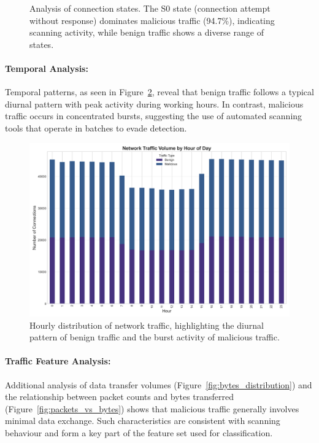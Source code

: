 \begin{figure}[htbp]
    \caption{Analysis of connection states. The S0 state (connection attempt without response) dominates malicious traffic (94.7\%), indicating scanning activity, while benign traffic shows a diverse range of states.}
    \label{fig:connection_states_analysis} %
\end{figure}


\paragraph{Temporal Analysis:}  
Temporal patterns, as seen in Figure~\ref{fig:hourly_traffic}, reveal that benign traffic follows a typical diurnal pattern with peak activity during working hours. In contrast, malicious traffic occurs in concentrated bursts, suggesting the use of automated scanning tools that operate in batches to evade detection.

\begin{figure}[htbp]
    \centering
    \includegraphics[width=\textwidth]{figures/hourly_traffic.png}
    \caption{Hourly distribution of network traffic, highlighting the diurnal pattern of benign traffic and the burst activity of malicious traffic.}
    \label{fig:hourly_traffic}
\end{figure}



\paragraph{Traffic Feature Analysis:}  
Additional analysis of data transfer volumes (Figure~\ref{fig:bytes_distribution}) and the relationship between packet counts and bytes transferred (Figure~\ref{fig:packets_vs_bytes}) shows that malicious traffic generally involves minimal data exchange. Such characteristics are consistent with scanning behaviour and form a key part of the feature set used for classification.

